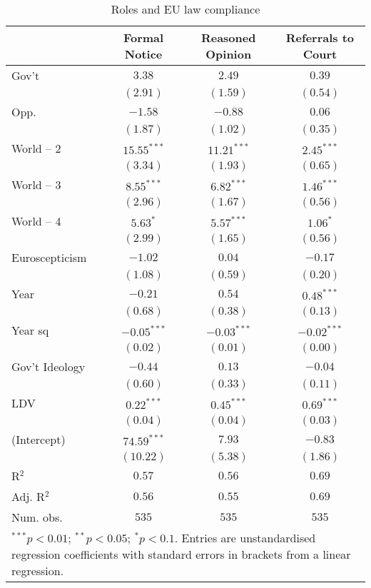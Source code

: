 
\begin{table}[htb]
\caption{Roles and EU law compliance}
\begin{center}
\begin{tabular}{l c c c}
\hline
 & Formal Notice & Reasoned Opinion & Referrals to Court \\
\hline
Gov't          & $3.38$        & $2.49$        & $0.39$        \\
               & $(2.91)$      & $(1.59)$      & $(0.54)$      \\
Opp.           & $-1.58$       & $-0.88$       & $0.06$        \\
               & $(1.87)$      & $(1.02)$      & $(0.35)$      \\
World -- 2     & $15.55^{***}$ & $11.21^{***}$ & $2.45^{***}$  \\
               & $(3.34)$      & $(1.93)$      & $(0.65)$      \\
World -- 3     & $8.55^{***}$  & $6.82^{***}$  & $1.46^{***}$  \\
               & $(2.96)$      & $(1.67)$      & $(0.56)$      \\
World -- 4     & $5.63^{*}$    & $5.57^{***}$  & $1.06^{*}$    \\
               & $(2.99)$      & $(1.65)$      & $(0.56)$      \\
Euroscepticism & $-1.02$       & $0.04$        & $-0.17$       \\
               & $(1.08)$      & $(0.59)$      & $(0.20)$      \\
Year           & $-0.21$       & $0.54$        & $0.48^{***}$  \\
               & $(0.68)$      & $(0.38)$      & $(0.13)$      \\
Year sq        & $-0.05^{***}$ & $-0.03^{***}$ & $-0.02^{***}$ \\
               & $(0.02)$      & $(0.01)$      & $(0.00)$      \\
Gov't Ideology & $-0.44$       & $0.13$        & $-0.04$       \\
               & $(0.60)$      & $(0.33)$      & $(0.11)$      \\
LDV            & $0.22^{***}$  & $0.45^{***}$  & $0.69^{***}$  \\
               & $(0.04)$      & $(0.04)$      & $(0.03)$      \\
(Intercept)    & $74.59^{***}$ & $7.93$        & $-0.83$       \\
               & $(10.22)$     & $(5.38)$      & $(1.86)$      \\
\hline
R$^2$          & $0.57$        & $0.56$        & $0.69$        \\
Adj. R$^2$     & $0.56$        & $0.55$        & $0.69$        \\
Num. obs.      & $535$         & $535$         & $535$         \\
\hline
\multicolumn{4}{l}{\scriptsize{\parbox{.7\linewidth}{$^{***}p<0.01$; $^{**}p<0.05$; $^{*}p<0.1$. Entries are unstandardised regression coefficients with standard errors in brackets from a linear regression.}}}
\end{tabular}
\label{t:roles}
\end{center}
\end{table}
